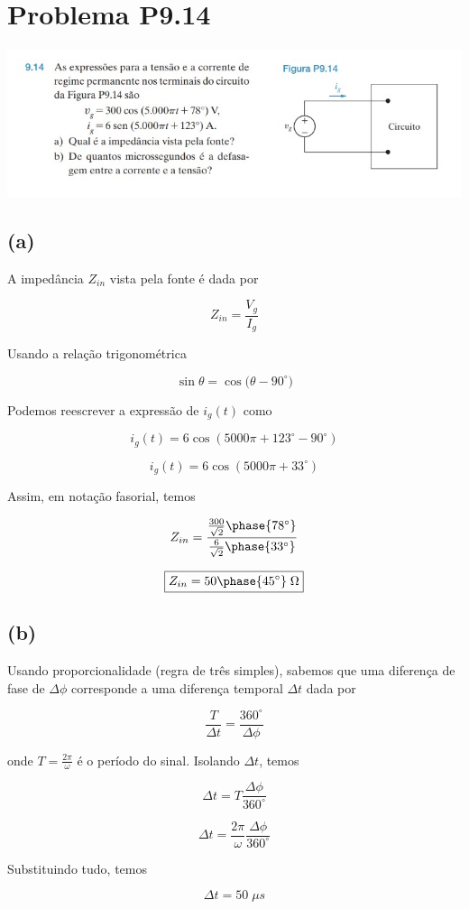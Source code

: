 \documentclass[12pt]{scrartcl}
\begin{document}
\section*{Problema P9.14}

\begin{center}
    \includegraphics[scale=1.0]{P9.14.jpg}
\end{center}

\subsection*{(a)}

A impedância \(Z_{in}\) vista pela fonte é dada por

\begin{equation}\label{eq:9.14.1}
    Z_{in} = \frac{V_g}{I_g}
\end{equation}

Usando a relação trigonométrica 

\[  \sin{\theta} = \cos({\theta - 90^{\circ})}  \]

Podemos reescrever a expressão de \(i_g(t)\) como

\[ i_g(t) = 6\cos({5000\pi + 123^{\circ} - 90^{\circ}})  \]

\[ i_g(t) = 6\cos({5000\pi + 33^{\circ}})  \]

Assim, em notação fasorial, temos 

\begin{equation}\label{eq:9.14.2}
    Z_{in} = \frac{\frac{300}{\sqrt{2}}\phase{78^{\circ}}}{\frac{6}{\sqrt{2}}\phase{33^{\circ}}}
\end{equation}

\[ \boxed{Z_{in} = 50\phase{45^{\circ}} \; \Omega}  \]

\subsection*{(b)}

Usando proporcionalidade (regra de três simples), sabemos que uma 
diferença de fase de \(\Delta \phi \) corresponde a uma diferença 
temporal \(\Delta t \) dada por    


\[ \frac{T}{\Delta t} = \frac{360^{\circ}}{\Delta \phi}  \]

onde \(T = \frac{2\pi}{\omega} \) é o período do sinal. Isolando \(\Delta t \), temos

\begin{equation}\label{eq:9.14.3}
    \Delta t = T \frac{\Delta \phi}{360^{\circ}}
\end{equation}

\[  \Delta t = \frac{2\pi}{\omega} \frac{\Delta \phi}{360^{\circ}}  \]

Substituindo tudo, temos

\[ \boxed{\Delta t = 50 \; \mu s}  \]
\end{document}
